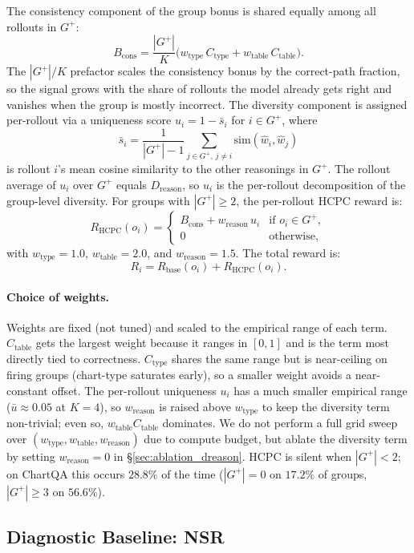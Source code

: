 \documentclass[11pt]{article}
\begin{document}
The consistency component of the group bonus is shared equally among
all rollouts in $G^+$:
\[
  B_{\text{cons}} = \frac{|G^+|}{K}
    \bigl(w_{\text{type}}\,C_{\text{type}}
        + w_{\text{table}}\,C_{\text{table}}\bigr).
\]
The $|G^+|/K$ prefactor scales the consistency bonus by the
correct-path fraction, so the signal grows with the share of rollouts
the model already gets right and vanishes when the group is mostly
incorrect.
The diversity component is assigned per-rollout via a uniqueness score
$u_i = 1 - \bar{s}_i$ for $i \in G^+$, where
\[
  \bar{s}_i = \frac{1}{|G^+|-1}\sum_{j \in G^+,\, j\neq i}
              \mathrm{sim}(\hat{w}_i, \hat{w}_j)
\]
is rollout $i$'s mean cosine similarity to the other reasonings in
$G^+$. The rollout average of $u_i$ over $G^+$ equals
$D_{\text{reason}}$, so $u_i$ is the per-rollout decomposition of the
group-level diversity. For groups with $|G^+| \ge 2$, the per-rollout
HCPC reward is:
\[
  R_{\text{HCPC}}(o_i) =
  \begin{cases}
    B_{\text{cons}} + w_{\text{reason}}\,u_i & \text{if } o_i \in G^+, \\
    0                                         & \text{otherwise,}
  \end{cases}
\]
with $w_{\text{type}}{=}1.0$, $w_{\text{table}}{=}2.0$, and
$w_{\text{reason}}{=}1.5$. The total reward is:
\[
  R_i = R_{\text{base}}(o_i) + R_{\text{HCPC}}(o_i).
\]
\paragraph{Choice of weights.}
Weights are fixed (not tuned) and scaled to the empirical range of
each term. $C_{\text{table}}$ gets the largest weight because it
ranges in $[0,1]$ and is the term most directly tied to correctness.
$C_{\text{type}}$ shares the same range but is near-ceiling on
firing groups (chart-type saturates early), so a smaller weight
avoids a near-constant offset. The per-rollout uniqueness $u_i$ has
a much smaller empirical range ($\bar{u}{\approx}0.05$ at $K{=}4$),
so $w_{\text{reason}}$ is raised above $w_{\text{type}}$ to keep
the diversity term non-trivial; even so,
$w_{\text{table}}C_{\text{table}}$ dominates. We do not perform a
full grid sweep over $(w_{\text{type}}, w_{\text{table}},
w_{\text{reason}})$ due to compute budget, but ablate the
diversity term by setting $w_{\text{reason}}{=}0$ in
\S\ref{sec:ablation_dreason}.
HCPC is silent when $|G^+|{<}2$; on ChartQA this occurs $28.8\%$ of
the time ($|G^+|{=}0$ on $17.2\%$ of groups, $|G^+|{\ge}3$ on
$56.6\%$).
\subsection{Diagnostic Baseline: NSR}
\label{sec:nsr}
\end{document}
